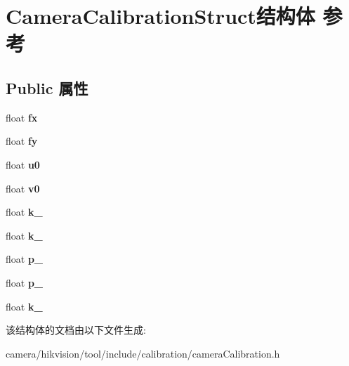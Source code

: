\hypertarget{struct_camera_calibration_struct}{}\section{Camera\+Calibration\+Struct结构体 参考}
\label{struct_camera_calibration_struct}
\subsection*{Public 属性}
\begin{DoxyCompactItemize}
\item 
\mbox{\label{struct_camera_calibration_struct_aab607842cfee12da0ca30135cfa4d40e}} 
float {\bfseries fx}
\item 
\mbox{\label{struct_camera_calibration_struct_a64e826f02d8e8f250e38cf9838588b0c}} 
float {\bfseries fy}
\item 
\mbox{\label{struct_camera_calibration_struct_ad9e00a2e441ea50df6f599bff04fda65}} 
float {\bfseries u0}
\item 
\mbox{\label{struct_camera_calibration_struct_abcf5ea2c9c2751a7193b165685e646fa}} 
float {\bfseries v0}
\item 
\mbox{\label{struct_camera_calibration_struct_ad4f4973ef1124d17332bbe4e81e019ef}} 
float {\bfseries k\+\_}
\item 
\mbox{\label{struct_camera_calibration_struct_af77708edad9e5739f65602645410bb24}} 
float {\bfseries k\+\_}
\item 
\mbox{\label{struct_camera_calibration_struct_a1e101a874e0afb1f50ad7515674e1897}} 
float {\bfseries p\+\_}
\item 
\mbox{\label{struct_camera_calibration_struct_a4a26ba853d9db6be5510d0066e4822ae}} 
float {\bfseries p\+\_}
\item 
\mbox{\label{struct_camera_calibration_struct_a1648d147d0fc13f5bd2fda572ca3838f}} 
float {\bfseries k\+\_}
\end{DoxyCompactItemize}


该结构体的文档由以下文件生成\+:\begin{DoxyCompactItemize}
\item 
camera/hikvision/tool/include/calibration/camera\+Calibration.\+h\end{DoxyCompactItemize}
